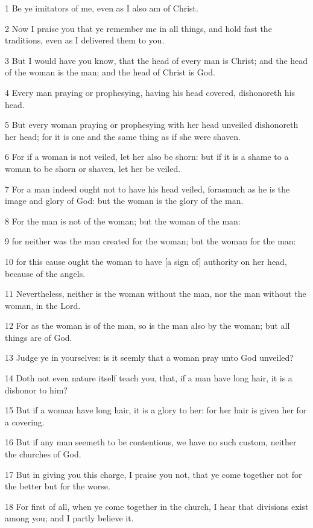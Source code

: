 \par 1 Be ye imitators of me, even as I also am of Christ.
\par 2 Now I praise you that ye remember me in all things, and hold fast the traditions, even as I delivered them to you.
\par 3 But I would have you know, that the head of every man is Christ; and the head of the woman is the man; and the head of Christ is God.
\par 4 Every man praying or prophesying, having his head covered, dishonoreth his head.
\par 5 But every woman praying or prophesying with her head unveiled dishonoreth her head; for it is one and the same thing as if she were shaven.
\par 6 For if a woman is not veiled, let her also be shorn: but if it is a shame to a woman to be shorn or shaven, let her be veiled.
\par 7 For a man indeed ought not to have his head veiled, forasmuch as he is the image and glory of God: but the woman is the glory of the man.
\par 8 For the man is not of the woman; but the woman of the man:
\par 9 for neither was the man created for the woman; but the woman for the man:
\par 10 for this cause ought the woman to have [a sign of] authority on her head, because of the angels.
\par 11 Nevertheless, neither is the woman without the man, nor the man without the woman, in the Lord.
\par 12 For as the woman is of the man, so is the man also by the woman; but all things are of God.
\par 13 Judge ye in yourselves: is it seemly that a woman pray unto God unveiled?
\par 14 Doth not even nature itself teach you, that, if a man have long hair, it is a dishonor to him?
\par 15 But if a woman have long hair, it is a glory to her: for her hair is given her for a covering.
\par 16 But if any man seemeth to be contentious, we have no such custom, neither the churches of God.
\par 17 But in giving you this charge, I praise you not, that ye come together not for the better but for the worse.
\par 18 For first of all, when ye come together in the church, I hear that divisions exist among you; and I partly believe it.
